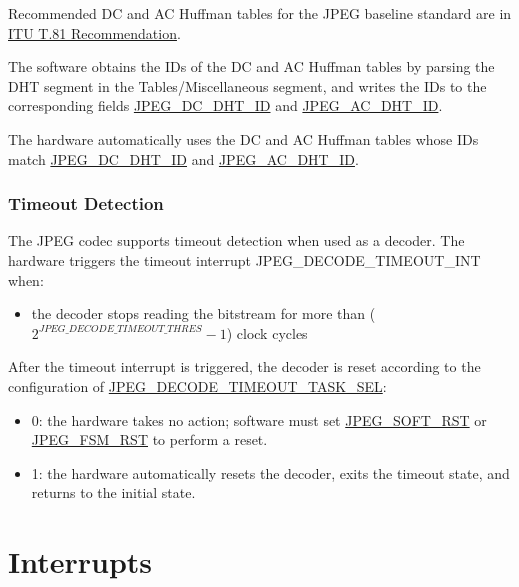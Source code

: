 \documentclass[main\_\_EN.tex]{subfiles}
\begin{document}
Recommended DC and AC Huffman tables for the JPEG baseline standard are in \href{https://www.itu.int/rec/T-REC-T.81}{ITU T.81 Recommendation}.

The software obtains the IDs of the DC and AC Huffman tables by parsing the DHT segment in the Tables/Miscellaneous segment, and writes the IDs to the corresponding fields \hyperref[regdesc:JPEGDHTINFOREG]{JPEG\_DC\_DHT\_ID} and \hyperref[regdesc:JPEGDHTINFOREG]{JPEG\_AC\_DHT\_ID}.

The hardware automatically uses the DC and AC Huffman tables whose IDs match \hyperref[regdesc:JPEGDHTINFOREG]{JPEG\_DC\_DHT\_ID} and \hyperref[regdesc:JPEGDHTINFOREG]{JPEG\_AC\_DHT\_ID}.

\subsubsection{Timeout Detection}
\label{sec:jpegcodec-dec-timeout}

The JPEG codec supports timeout detection when used as a decoder. The hardware triggers the timeout interrupt JPEG\_DECODE\_TIMEOUT\_INT when:
\begin{itemize}
    \item the decoder stops reading the bitstream for more than ($ 2 ^ {\hyperref[fielddesc:JPEGDECODETIMEOUTTHRES]{JPEG\_DECODE\_TIMEOUT\_THRES}} - 1 $) clock cycles
\end{itemize}

After the timeout interrupt is triggered, the decoder is reset according to the configuration of \hyperref[fielddesc:JPEGDECODETIMEOUTTASKSEL]{JPEG\_DECODE\_TIMEOUT\_TASK\_SEL}:
\begin{itemize}
    \item 0: the hardware takes no action; software must set \hyperref[fielddesc:JPEGSOFTRST]{JPEG\_SOFT\_RST} or \hyperref[fielddesc:JPEGFSMRST]{JPEG\_FSM\_RST} to perform a reset.
    \item 1: the hardware automatically resets the decoder, exits the timeout state, and returns to the initial state.
\end{itemize}


\section{Interrupts}
\label{sec:jpegcodec-interrupts}
\end{document}
